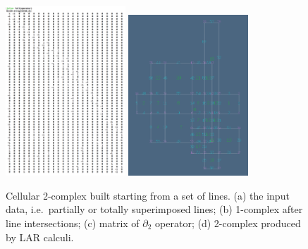\documentclass[11pt, oneside]{article}   	%
\begin{document}
\begin{figure}[htbp]
   \includegraphics[width=0.4\textwidth]{rectangles2} 
   \includegraphics[width=0.4\textwidth]{rectangles3} 
   \caption{Cellular 2-complex built starting from a set of lines. (a) the input data, i.e.~partially or totally superimposed lines; (b) 1-complex after line intersections; (c) matrix of $\partial_2$ operator; (d) 2-complex produced by LAR calculi.}
   \label{fig:rectangles}
\end{figure}
\end{document}
